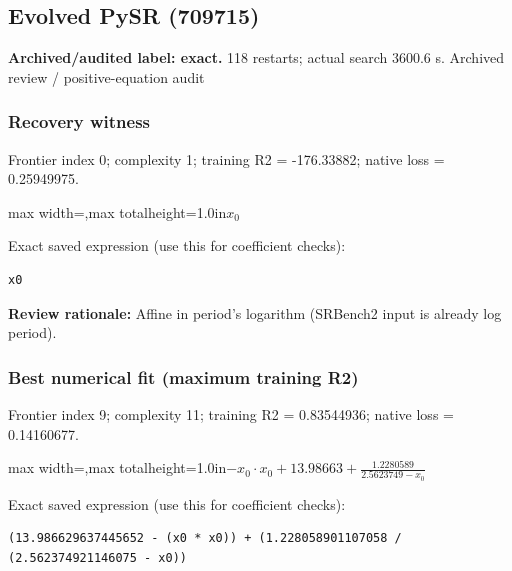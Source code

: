 \documentclass[10pt,letterpaper,landscape]{article}
\begin{document}
\begin{minipage}[t]{0.485\textwidth}
\subsection*{Evolved PySR (709715)}
\textbf{Archived/audited label: exact.} 118 restarts; actual search 3600.6 s.
{\small Archived review / positive-equation audit}
\subsubsection*{Recovery witness}
Frontier index 0; complexity 1; training R2 = -176.33882; native loss = 0.25949975.
\begin{center}\begin{adjustbox}{max width=\linewidth,max totalheight=1.0in}$\displaystyle x_{0}$\end{adjustbox}\end{center}
{\scriptsize Exact saved expression (use this for coefficient checks):}
\begin{lstlisting}
x0
\end{lstlisting}
{\small\textbf{Review rationale:} Affine in period's logarithm (SRBench2 input is already log period).}
\subsubsection*{Best numerical fit (maximum training R2)}
Frontier index 9; complexity 11; training R2 = 0.83544936; native loss = 0.14160677.
\begin{center}\begin{adjustbox}{max width=\linewidth,max totalheight=1.0in}$\displaystyle - x_{0} \cdot x_{0} + 13.98663 + \frac{1.2280589}{2.5623749 - x_{0}}$\end{adjustbox}\end{center}
{\scriptsize Exact saved expression (use this for coefficient checks):}
\begin{lstlisting}
(13.986629637445652 - (x0 * x0)) + (1.228058901107058 / (2.562374921146075 - x0))
\end{lstlisting}
\end{minipage}
\clearpage{}\label{leavitt-10005}
\end{document}
